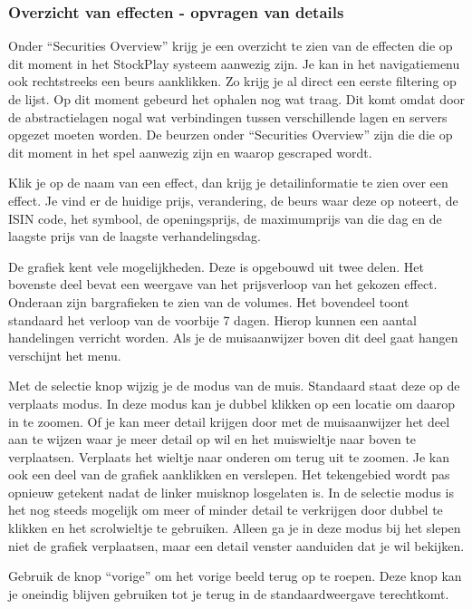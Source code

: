 \subsubsection{Overzicht van effecten - opvragen van details}

Onder ``Securities Overview'' krijg je een overzicht te zien van de effecten die op dit moment in het StockPlay systeem aanwezig zijn. Je kan in het navigatiemenu ook rechtstreeks een beurs aanklikken. Zo krijg je al direct een eerste filtering op de lijst.
Op dit moment gebeurd het ophalen nog wat traag. Dit komt omdat door de abstractielagen nogal wat verbindingen tussen verschillende lagen en servers opgezet moeten worden.
De beurzen onder ``Securities Overview'' zijn die die op dit moment in het spel aanwezig zijn en waarop gescraped wordt.

Klik je op de naam van een effect, dan krijg je detailinformatie te zien over een effect.
Je vind er de huidige prijs, verandering, de beurs waar deze op noteert, de ISIN code, het symbool, de openingsprijs, de maximumprijs van die dag en de laagste prijs van de laagste verhandelingsdag.

De grafiek kent vele mogelijkheden.
Deze is opgebouwd uit twee delen. Het bovenste deel bevat een weergave van het prijsverloop van het gekozen effect. Onderaan zijn bargrafieken te zien van de volumes. Het bovendeel toont standaard het verloop van de voorbije 7 dagen. Hierop kunnen een aantal handelingen verricht worden.
Als je de muisaanwijzer boven dit deel gaat hangen verschijnt het menu.

Met de selectie knop wijzig je de modus van de muis. Standaard staat deze op de verplaats modus.
In deze modus kan je dubbel klikken op een locatie om daarop in te zoomen. Of je kan meer detail krijgen door met de muisaanwijzer het deel aan te wijzen waar je meer detail op wil en het muiswieltje naar boven te verplaatsen. Verplaats het wieltje naar onderen om terug uit te zoomen.
Je kan ook een deel van de grafiek aanklikken en verslepen. Het tekengebied wordt pas opnieuw getekent nadat de linker muisknop losgelaten is.
In de selectie modus is het nog steeds mogelijk om meer of minder detail te verkrijgen door dubbel te klikken en het scrolwieltje te gebruiken.
Alleen ga je in deze modus bij het slepen niet de grafiek verplaatsen, maar een detail venster aanduiden dat je wil bekijken.

Gebruik de knop ``vorige'' om het vorige beeld terug op te roepen. Deze knop kan je oneindig blijven gebruiken tot je terug in de standaardweergave terechtkomt.

